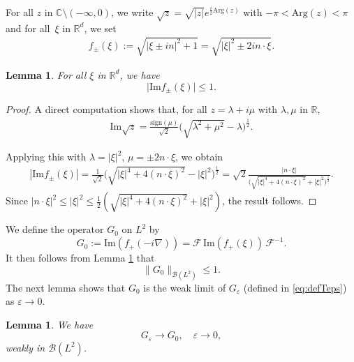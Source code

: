 \documentclass[12pt]{article}
\newcommand{\Teps}{{G_\varepsilon}}
\newcommand{\Tzero}{{G_0}}
\theoremstyle{plain}
\newtheorem{lemma}[theo]{Lemma}
\begin{document}
For all $z$ in $\mathbb{C}\setminus(-\infty,0)$, we write $\sqrt{z}=\sqrt{|z|}e^{\frac{i}{2}\mathrm{Arg}(z)}$ with $-\pi<\mathrm{Arg}(z)<\pi$ and for all~$\xi$ in $\mathbb{R}^d$, we set
	\begin{align}\label{eq:def_fpm}
    f_\pm(\xi):=\sqrt{|\xi\pm in|^2+1}=\sqrt{|\xi|^2\pm 2in\cdot\xi}.
\end{align}


\begin{lemma}\label{lm:bound_fpm}
    For all $\xi$ in $\mathbb{R}^d$, we have
    \begin{equation*}
        \big|\mathrm{Im}f_\pm(\xi)\big|\le1.
    \end{equation*}
\end{lemma}

\begin{proof}
    A direct computation shows that, for all $z=\lambda+i\mu$ with $\lambda,\mu$ in $\mathbb{R}$,
    \begin{align*}
        \mathrm{Im}\sqrt{z}=\frac{\mathrm{sign}(\mu)}{\sqrt{2}}\big(\sqrt{\lambda^2+\mu^2}-\lambda\big)^\frac12.
    \end{align*}

    
Applying this with $\lambda=|\xi|^2$, $\mu=\pm2 n\cdot\xi$, we obtain
\begin{align*}
    |\mathrm{Im}f_\pm(\xi)|=\frac1{\sqrt{2}}\big(\sqrt{|\xi|^4+4(n\cdot\xi)^2}-|\xi|^2\big)^\frac12=\sqrt{2}\frac{|n\cdot\xi|}{\big(\sqrt{|\xi|^4+4(n\cdot\xi)^2}+|\xi|^2\big)^\frac12}.
\end{align*}
Since $|n\cdot\xi|^2\le|\xi|^2\le\frac12(\sqrt{|\xi|^4+4(n\cdot\xi)^2}+|\xi|^2)$, the result follows.
\end{proof}




We define the operator $\Tzero$ on $L^2$ by
\begin{equation}\label{eq:defT0}
    \Tzero := \mathrm{Im}(f_+(-i\nabla)) = \mathcal{F} \, \mathrm{Im}(f_+(\xi)) \,  \mathcal{F}^{-1}.
\end{equation}
It then follows from Lemma \ref{lm:bound_fpm} that
\begin{equation}
    \|\Tzero\|_{\mathcal{B}(L^2)}\le1. \label{eq:borne-T0}
\end{equation}
The next lemma shows that $\Tzero$ is the weak limit of $\Teps$ (defined in \eqref{eq:defTeps}) as $\varepsilon\to0$.



\begin{lemma}\label{lm:strongconv}
We have
\begin{equation*}
    \Teps \to \Tzero, \quad \varepsilon\to0,
\end{equation*}
weakly in $\mathcal{B}(L^2)$.
\end{lemma}
\end{document}
